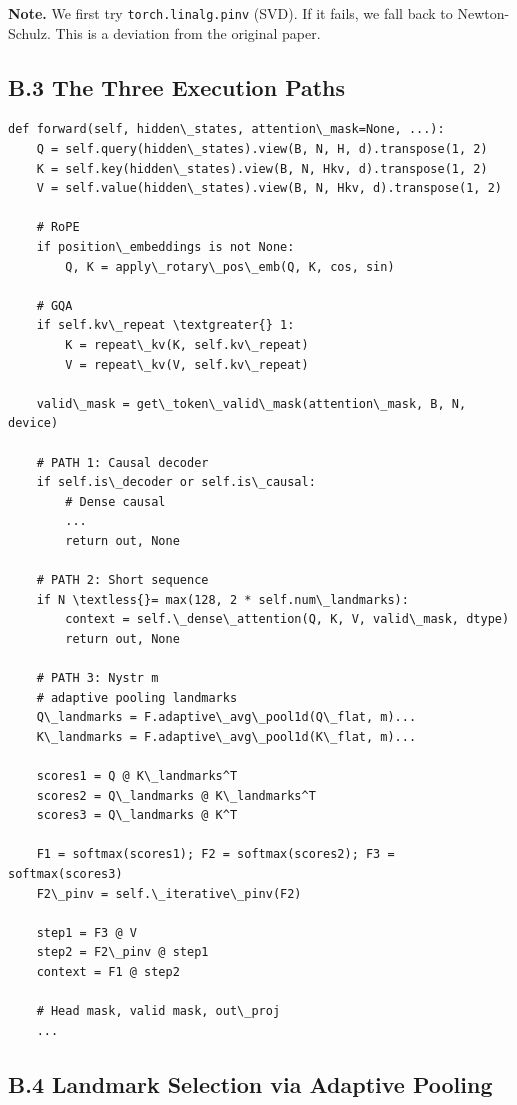 \textbf{Note.} We first try \texttt{torch.linalg.pinv} (SVD). If it fails, we fall back 
to Newton-Schulz. This is a deviation from the original paper.

\subsection{B.3 The Three Execution Paths}

\begin{lstlisting}
def forward(self, hidden\_states, attention\_mask=None, ...):
    Q = self.query(hidden\_states).view(B, N, H, d).transpose(1, 2)
    K = self.key(hidden\_states).view(B, N, Hkv, d).transpose(1, 2)
    V = self.value(hidden\_states).view(B, N, Hkv, d).transpose(1, 2)
    
    # RoPE
    if position\_embeddings is not None:
        Q, K = apply\_rotary\_pos\_emb(Q, K, cos, sin)
    
    # GQA
    if self.kv\_repeat \textgreater{} 1:
        K = repeat\_kv(K, self.kv\_repeat)
        V = repeat\_kv(V, self.kv\_repeat)
    
    valid\_mask = get\_token\_valid\_mask(attention\_mask, B, N, device)
    
    # PATH 1: Causal decoder
    if self.is\_decoder or self.is\_causal:
        # Dense causal
        ...
        return out, None
    
    # PATH 2: Short sequence
    if N \textless{}= max(128, 2 * self.num\_landmarks):
        context = self.\_dense\_attention(Q, K, V, valid\_mask, dtype)
        return out, None
    
    # PATH 3: Nystr m
    # adaptive pooling landmarks
    Q\_landmarks = F.adaptive\_avg\_pool1d(Q\_flat, m)...
    K\_landmarks = F.adaptive\_avg\_pool1d(K\_flat, m)...
    
    scores1 = Q @ K\_landmarks^T
    scores2 = Q\_landmarks @ K\_landmarks^T
    scores3 = Q\_landmarks @ K^T
    
    F1 = softmax(scores1); F2 = softmax(scores2); F3 = softmax(scores3)
    F2\_pinv = self.\_iterative\_pinv(F2)
    
    step1 = F3 @ V
    step2 = F2\_pinv @ step1
    context = F1 @ step2
    
    # Head mask, valid mask, out\_proj
    ...
\end{lstlisting}

\subsection{B.4 Landmark Selection via Adaptive Pooling}

